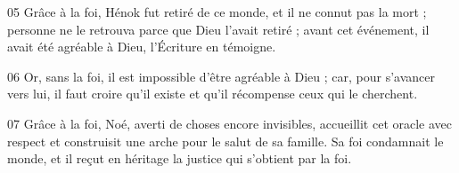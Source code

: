 
05 Grâce à la foi, Hénok fut retiré de ce monde, et il ne connut pas la mort ; personne ne le retrouva parce que Dieu l’avait retiré ; avant cet événement, il avait été agréable à Dieu, l’Écriture en témoigne.

06 Or, sans la foi, il est impossible d’être agréable à Dieu ; car, pour s’avancer vers lui, il faut croire qu’il existe et qu’il récompense ceux qui le cherchent.

07 Grâce à la foi, Noé, averti de choses encore invisibles, accueillit cet oracle avec respect et construisit une arche pour le salut de sa famille. Sa foi condamnait le monde, et il reçut en héritage la justice qui s’obtient par la foi.
